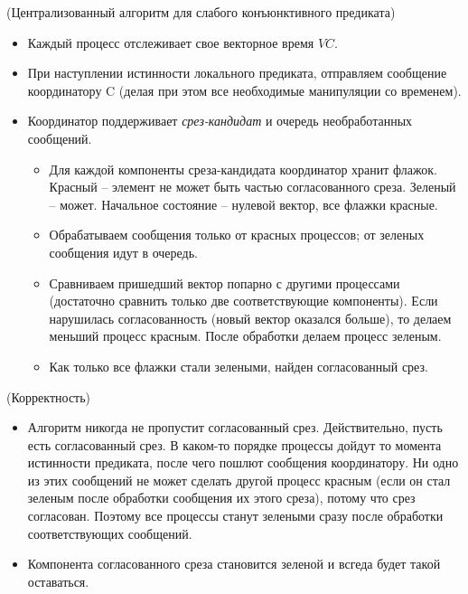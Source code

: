 \begin{algorithm}(Централизованный алгоритм для слабого конъюнктивного предиката)
    \enewline
    \begin{itemize}
        \item Каждый процесс отслеживает свое векторное время $VC$.
        \item При наступлении истинности локального предиката,
            отправляем сообщение координатору C (делая при этом все
            необходимые манипуляции со временем).
        \item Координатор поддерживает \textit{срез-кандидат} и
            очередь необработанных сообщений.
            \begin{itemize}
                \item Для каждой компоненты среза-кандидата координатор хранит
                    флажок. Красный -- элемент не может быть частью согласованного
                    среза. Зеленый -- может. Начальное состояние -- нулевой вектор,
                    все флажки красные.
                \item Обрабатываем сообщения только от красных процессов; от зеленых
                    сообщения идут в очередь.
                \item Сравниваем пришедший вектор попарно с другими процессами
                    (достаточно сравнить только две соответствующие компоненты).
                    Если нарушилась согласованность (новый вектор оказался больше),
                    то делаем меньший процесс красным. После обработки делаем
                    процесс зеленым.
                \item Как только все флажки стали зелеными, найден согласованный срез.
            \end{itemize}
    \end{itemize}
\end{algorithm}

\begin{theorem}(Корректность)
    \enewline
    \begin{itemize}
        \item Алгоритм никогда не пропустит согласованный срез. Действительно,
            пусть есть согласованный срез. В каком-то порядке процессы дойдут
            то момента истинности предиката, после чего пошлют сообщения координатору.
            Ни одно из этих сообщений не может сделать другой процесс красным
            (если он стал зеленым после обработки сообщения их этого среза),
            потому что срез согласован. Поэтому все процессы станут зелеными
            сразу после обработки соответствующих сообщений.
        \item Компонента согласованного среза становится зеленой
            и всгеда будет такой оставаться.
    \end{itemize}
\end{theorem}

